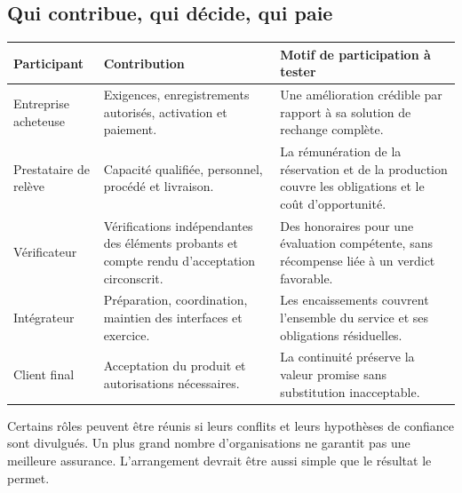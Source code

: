 \documentclass[11pt,a4paper]{article}
\begin{document}
\subsection{Qui contribue, qui décide, qui paie}
\begin{center}\small
\begin{tabularx}{\textwidth}{P{.21\textwidth}YY}
\toprule
\textbf{Participant} & \textbf{Contribution} & \textbf{Motif de participation à tester}\\
\midrule
Entreprise acheteuse & Exigences, enregistrements autorisés, activation et paiement. & Une amélioration crédible par rapport à sa solution de rechange complète.\\
Prestataire de relève & Capacité qualifiée, personnel, procédé et livraison. & La rémunération de la réservation et de la production couvre les obligations et le coût d’opportunité.\\
Vérificateur & Vérifications indépendantes des éléments probants et compte rendu d’acceptation circonscrit. & Des honoraires pour une évaluation compétente, sans récompense liée à un verdict favorable.\\
Intégrateur & Préparation, coordination, maintien des interfaces et exercice. & Les encaissements couvrent l’ensemble du service et ses obligations résiduelles.\\
Client final & Acceptation du produit et autorisations nécessaires. & La continuité préserve la valeur promise sans substitution inacceptable.\\
\bottomrule
\end{tabularx}
\end{center}
Certains rôles peuvent être réunis si leurs conflits et leurs hypothèses de confiance sont divulgués. Un plus grand nombre d’organisations ne garantit pas une meilleure assurance. L’arrangement devrait être aussi simple que le résultat le permet.
\end{document}
